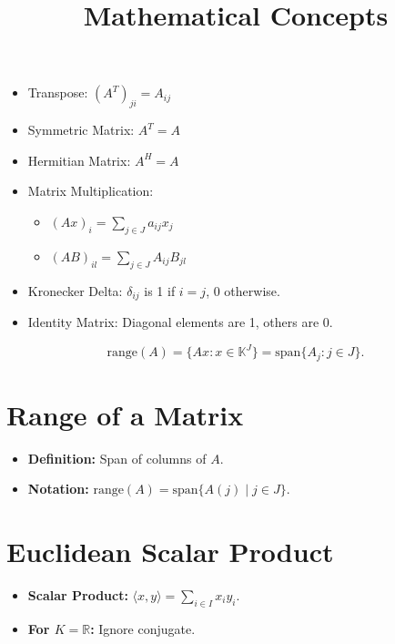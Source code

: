 \documentclass{article}
\begin{document}
    






\begin{itemize}[leftmargin=*]
    \item Transpose: \( (A^T)_{ji} = A_{ij} \)
    \item Symmetric Matrix: \( A^T = A \)
    \item Hermitian Matrix: \( A^H = A \)
    \item Matrix Multiplication:
    \begin{itemize}[leftmargin=*]
        \item \( (Ax)_i = \sum_{j \in J} a_{ij}x_j \)
        \item \( (AB)_{il} = \sum_{j \in J} A_{ij}B_{jl} \)
    \end{itemize}
    \item Kronecker Delta: \( \delta_{ij} \) is 1 if \( i = j \), 0 otherwise.
    \item Identity Matrix: Diagonal elements are 1, others are 0.
\end{itemize}









\[
\text{range}(A) = \{Ax : x \in \mathbb{K}^J\} = \text{span}\{A_j : j \in J\}.
\]










\title{Mathematical Concepts}
\author{}
\date{}



\maketitle

\section*{Range of a Matrix}
\begin{itemize}
    \item \textbf{Definition:} Span of columns of \( A \).
    \item \textbf{Notation:} \( \text{range}(A) = \text{span}\{A(j) \mid j \in J\} \).
\end{itemize}

\section*{Euclidean Scalar Product}
\begin{itemize}
    \item \textbf{Scalar Product:} \( \langle x, y \rangle = \sum_{i \in I} x_i y_i \).
    \item \textbf{For \( K = \mathbb{R} \):} Ignore conjugate.
\end{itemize}
\end{document}
